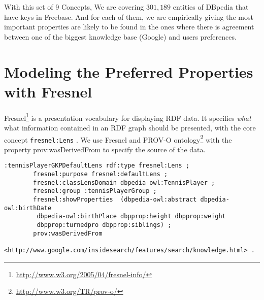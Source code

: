 \documentclass[runningheads,a4paper]{llncs}
\begin{document}
\begin{table}[!htp]
\end{table}
With this set of 9 Concepts, We are covering $301,189$ entities of DBpedia that have keys in Freebase. And for each of them, we are empirically giving the most important properties are likely to be found in the ones where there is agreement between one of the biggest knowledge base (Google) and users preferences.


\section{Modeling the Preferred Properties with Fresnel}
\label{sec:fresnel}
Fresnel\footnote{\url{http://www.w3.org/2005/04/fresnel-info/}} is a presentation vocabulary for displaying RDF data. It specifies \textit{what} what information contained in an RDF graph should be presented, with the core concept \texttt{fresnel:Lens} \cite{pietriga2006}. We use Fresnel and PROV-O ontology\footnote{\url{http://www.w3.org/TR/prov-o/}} with the property \textsf{prov:wasDerivedFrom} to specify the source of the data.

\begin{verbatim}
:tennisPlayerGKPDefaultLens rdf:type fresnel:Lens ;
		fresnel:purpose fresnel:defaultLens ;
		fresnel:classLensDomain dbpedia-owl:TennisPlayer ;
		fresnel:group :tennisPlayerGroup ;
		fresnel:showProperties  (dbpedia-owl:abstract dbpedia-owl:birthDate
		 dbpedia-owl:birthPlace dbpprop:height dbpprop:weight
		 dbpprop:turnedpro dbpprop:siblings) ;
		prov:wasDerivedFrom
		<http://www.google.com/insidesearch/features/search/knowledge.html> .		
\end{verbatim}	
\end{document}

